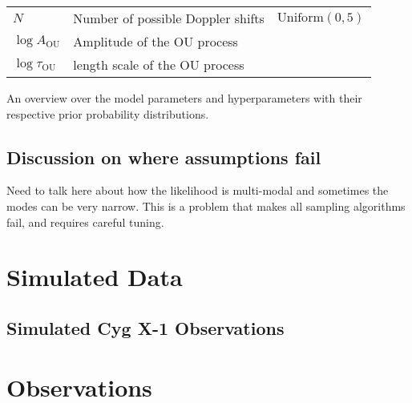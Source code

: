 \documentclass[12pt]{emulateapj}
\begin{document}
\begin{table*}[hbtp]
\begin{threeparttable}
\begin{tabularx}{\textwidth}{p{4.0cm}p{7.0cm}X}
$N$ & Number of possible Doppler shifts & $\mathrm{Uniform}(0,5)$  \\
$\log{A_{\mathrm{OU}}}$ & Amplitude of the OU process & \\
$\log{\tau_{\mathrm{OU}}}$ & length scale of the OU process & \\
\bottomrule
\end{tabularx}
   \begin{tablenotes}
      \item{An overview over the model parameters and hyperparameters with their respective prior probability distributions.}
\end{tablenotes}
\end{threeparttable}
\label{tab:priortable}
\end{table*}


\subsection{Discussion on where assumptions fail}

Need to talk here about how the likelihood is multi-modal and sometimes the modes can be very narrow. 
This is a problem that makes all sampling algorithms fail, and requires careful tuning.


\section{Simulated Data}

\subsection{Simulated Cyg X-1 Observations}

\section{Observations}
\end{document}
